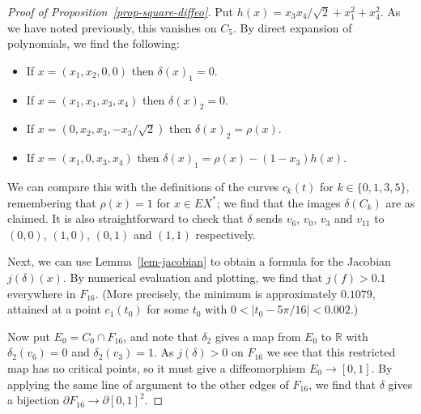 \documentclass[reqno]{amsart}
\newcommand{\dl}        {\delta}
\newcommand{\R}         {{\mathbb{R}}}
\newcommand{\rt}        {\sqrt{2}}
\renewcommand{\:}{\colon}
\theoremstyle{definition}
\begin{document}
\begin{proof}[Proof of Proposition~\ref{prop-square-diffeo}]
 Put $h(x)=x_3x_4/\rt+x_1^2+x_4^2$.  As we have noted previously, this
 vanishes on $C_5$.  By direct expansion of polynomials, we find the
 following:
 \begin{itemize}
  \item If $x=(x_1,x_2,0,0)$ then $\dl(x)_1=0$.
  \item If $x=(x_1,x_1,x_3,x_4)$ then $\dl(x)_2=0$.
  \item If $x=(0,x_2,x_3,-x_3/\rt)$ then $\dl(x)_2=\rho(x)$.
  \item If $x=(x_1,0,x_3,x_4)$ then $\dl(x)_1=\rho(x)-(1-x_3)h(x)$.
 \end{itemize}
 We can compare this with the definitions of the curves $c_k(t)$ for
 $k\in\{0,1,3,5\}$, remembering that $\rho(x)=1$ for $x\in EX^*$; we
 find that the images $\dl(C_k)$ are as claimed.  It is also
 straightforward to check that $\dl$ sends $v_6$, $v_0$, $v_3$ and
 $v_{11}$ to $(0,0)$, $(1,0)$, $(0,1)$ and $(1,1)$ respectively.

 Next, we can use Lemma~\ref{lem-jacobian} to obtain a formula for the
 Jacobian $j(\dl)(x)$.  By numerical evaluation and plotting, we find
 that $j(f)>0.1$ everywhere in $F_{16}$.  (More precisely, the minimum
 is approximately $0.1079$, attained at a point $c_1(t_0)$ for some
 $t_0$ with $0<|t_0-5\pi/16|<0.002$.)

 Now put $E_0=C_0\cap F_{16}$, and note that $\dl_2$ gives a map from
 $E_0$ to $\R$ with $\dl_2(v_6)=0$ and $\dl_2(v_3)=1$.  As $j(\dl)>0$
 on $F_{16}$ we see that this restricted map has no critical points,
 so it must give a diffeomorphism $E_0\to[0,1]$.  By applying the same
 line of argument to the other edges of $F_{16}$, we find that $\dl$
 gives a bijection $\partial F_{16}\to\partial [0,1]^2$.


\end{proof}
\end{document}
